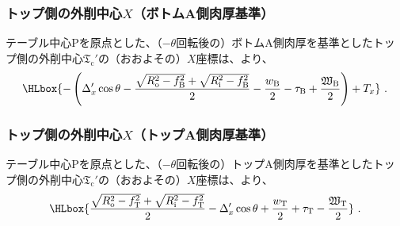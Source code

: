 \subsubsection{トップ側の外削中心\texorpdfstring{$X$}{X}（ボトムA側肉厚基準）}
テーブル中心Pを原点とした、（$-\theta$回転後の）ボトムA側肉厚を基準としたトップ側の外削中心$\mathfrak T_\mathrm c'$の（おおよその）$X$座標は、より、
\begin{align*}
  \HLbox{%
    -\left(
      \Delta_x'\cos\theta
      -\frac{\sqrt{R_\mathrm o^2-f_\mathrm B^2}+\sqrt{R_\mathrm i^2-f_\mathrm B^2}}2
      -\frac{w_\mathrm B}2
      -\tau_\mathrm B
      +\frac{\mathfrak W_\mathrm B}2
    \right)
    +T_x
  }\ .
\end{align*}

\subsubsection{トップ側の外削中心\texorpdfstring{$X$}{X}（トップA側肉厚基準）}
テーブル中心Pを原点とした、（$-\theta$回転後の）トップA側肉厚を基準としたトップ側の外削中心$\mathfrak T_\mathrm c'$の（おおよその）$X$座標は、より、
\begin{align*}
  \HLbox{%
    \frac{\sqrt{R_\mathrm o^2-f_\mathrm T^2}+\sqrt{R_\mathrm i^2-f_\mathrm T^2}}2
    -\Delta_x'\cos\theta
    +\frac{w_\mathrm T}2
    +\tau_\mathrm T
    -\frac{\mathfrak W_\mathrm T}2
  }\ .
\end{align*}

